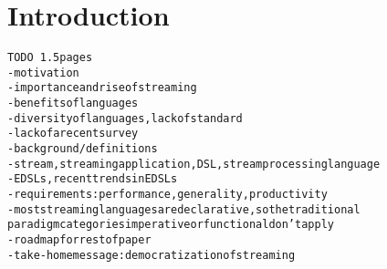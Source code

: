 \section{Introduction}\label{sec:introduction}

\begin{alltt}TODO\scriptsize ~1.5 pages
- motivation
  - importance and rise of streaming
  - benefits of languages
  - diversity of languages, lack of standard
  - lack of a recent survey \cite{stephens_1997} \cite{johnston_hanna_millar_2004}
- background / definitions
  - stream, streaming application, DSL, stream processing language
  - EDSLs \cite{hudak_1998}, recent trends in EDSLs
  - requirements: performance, generality, productivity
  - most streaming languages are declarative, so the traditional
    paradigm categories imperative or functional don't apply
- roadmap for rest of paper
- take-home message: democratization of streaming
\end{alltt}
